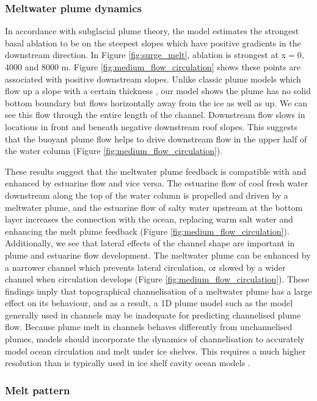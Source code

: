 \subsubsection{Meltwater plume dynamics} 
In accordance with subglacial plume theory, the model estimates the strongest basal ablation to be on the steepest slopes which have  positive gradients in the downstream direction. In Figure \ref{fig:surge_melt}, ablation is strongest at x$=$0, 4000 and 8000 m. Figure \ref{fig:medium_flow_circulation} shows these points are associated with positive downstream slopes. 
Unlike classic plume models which flow up a slope with a certain thickness \citep[e.g.][]{hewitt2020subglacial}, our model shows the plume has no solid bottom boundary but flows horizontally away from the ice as well as up. We can see this flow through the entire length of the channel. Downstream flow slows in locations in front and beneath negative downstream roof slopes. This suggests that the buoyant plume flow helps to drive downstream flow in the upper half of the water column (Figure \ref{fig:medium_flow_circulation}).

These results suggest that the meltwater plume feedback is compatible with and enhanced by estuarine flow and vice versa. The estuarine flow of cool fresh water downstream along the top of the water column is propelled and driven by a meltwater plume, and the estuarine flow of salty water upstream at the bottom layer increases the connection with the ocean, replacing warm salt water and enhancing the melt plume feedback (Figure \ref{fig:medium_flow_circulation}).
Additionally, we see that lateral effects of the channel shape are important in plume and estuarine flow development. The meltwater plume can be enhanced by a narrower channel which prevents lateral circulation, or slowed by a wider channel when circulation develops (Figure \ref{fig:medium_flow_circulation}). 
These findings imply that topographical channelisation of a meltwater plume has a large effect on its behaviour, and as a result, a 1D plume model such as the \cite{jenkins2011convection} model generally used in channels may be inadequate for predicting channelised plume flow.
Because plume melt in channels behaves differently from unchannelised plumes, models should incorporate the dynamics of channelisation to accurately model ocean circulation and melt under ice shelves. This requires a much higher resolution than is typically used in ice shelf cavity ocean models \cite[e.g.][]{holland2003modelling}. 

\subsubsection{Melt pattern}

